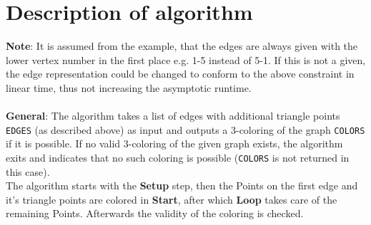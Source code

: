 \documentclass[english]{scrartcl}
\newcommand{\code}{\texttt}
\begin{document}
\section{Description of algorithm}
\label{sec:description}
\textbf{Note}: It is assumed from the example, that the edges are always given with the lower vertex number in the first place e.g. 1-5 instead of 5-1. If this is not a given, the edge representation could be changed to conform to the above constraint in linear time, thus not increasing the asymptotic runtime. 
\\ \\
\textbf{General}: The algorithm takes a list of edges with additional triangle points \code{EDGES} (as described above) as input and outputs a 3-coloring of the graph \code{COLORS} if it is possible. If no valid 3-coloring of the given graph exists, the algorithm exits and indicates that no such coloring is possible (\code{COLORS} is not returned in this case).
\\
The algorithm starts with the \textbf{Setup} step, then the Points on the first edge and it's triangle points are colored in \textbf{Start}, after which \textbf{Loop} takes care of the remaining Points. Afterwards the validity of the coloring is checked. 
\end{document}
